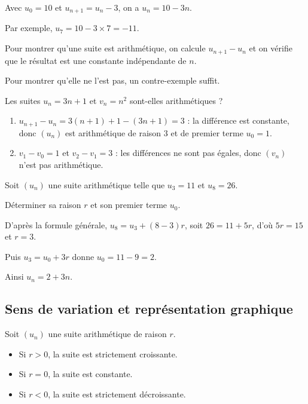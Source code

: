\documentclass{poly}
\begin{document}
\begin{ex}
	Avec $u_0 = 10$ et $u_{n+1} = u_n - 3$, on a $u_n = 10 - 3n$.

	Par exemple, $u_7 = 10 - 3 \times 7 = -11$.
\end{ex}

\begin{methode}
	Pour montrer qu'une suite est arithmétique, on calcule $u_{n+1} - u_n$ et on vérifie que le résultat est une constante indépendante de $n$.

	Pour montrer qu'elle ne l'est pas, un contre-exemple suffit.

	Les suites $u_n = 3n + 1$ et $v_n = n^2$ sont-elles arithmétiques ?

	\begin{correction}
		\nline
		\begin{enumerate}
			\item $u_{n+1} - u_n = 3(n + 1) + 1 - (3n + 1) = 3$ : la différence est constante, donc $(u_n)$ est arithmétique de raison $3$ et de premier terme $u_0 = 1$.
			\item $v_1 - v_0 = 1$ et $v_2 - v_1 = 3$ : les différences ne sont pas égales, donc $(v_n)$ n'est pas arithmétique.
		\end{enumerate}
	\end{correction}
\end{methode}

\begin{methode}
	Soit $(u_n)$ une suite arithmétique telle que $u_3 = 11$ et $u_8 = 26$.

	Déterminer sa raison $r$ et son premier terme $u_0$.

	\begin{correction}
		\nline
		D'après la formule générale, $u_8 = u_3 + (8 - 3)r$, soit $26 = 11 + 5r$, d'où $5r = 15$ et $r = 3$.

		Puis $u_3 = u_0 + 3r$ donne $u_0 = 11 - 9 = 2$.

		Ainsi $u_n = 2 + 3n$.
	\end{correction}
\end{methode}

\subsection{Sens de variation et représentation graphique}

\begin{propriete}
	Soit $(u_n)$ une suite arithmétique de raison $r$.
	\begin{itemize}
		\item Si $r > 0$, la suite est strictement croissante.
		\item Si $r = 0$, la suite est constante.
		\item Si $r < 0$, la suite est strictement décroissante.
	\end{itemize}
\end{propriete}
\end{document}
